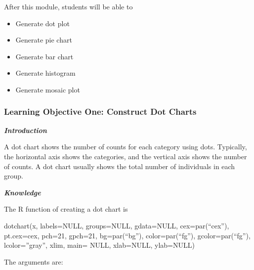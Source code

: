 After this module, students will be able to

\begin{itemize}
\item
  Generate dot plot
\item
  Generate pie chart
\item
  Generate bar chart
\item
  Generate histogram
\item
  Generate mosaic plot
\end{itemize}

\hypertarget{learning-objective-one-construct-dot-charts}{%
\subsubsection{Learning Objective One: Construct Dot
Charts}\label{learning-objective-one-construct-dot-charts}}

\emph{\textbf{Introduction}}

A dot chart shows the number of counts for each category using dots.
Typically, the horizontal axis shows the categories, and the vertical
axis shows the number of counts. A dot chart usually shows the total
number of individuals in each group.

\emph{\textbf{Knowledge}}

The R function of creating a dot chart is

dotchart(x, labels=NULL, groups=NULL, gdata=NULL, cex=par(``cex''),
pt.cex=cex, pch=21, gpch=21, bg=par(``bg''), color=par(``fg''),
gcolor=par(``fg''), lcolor=''gray'', xlim, main= NULL, xlab=NULL,
ylab=NULL)

The arguments are:

